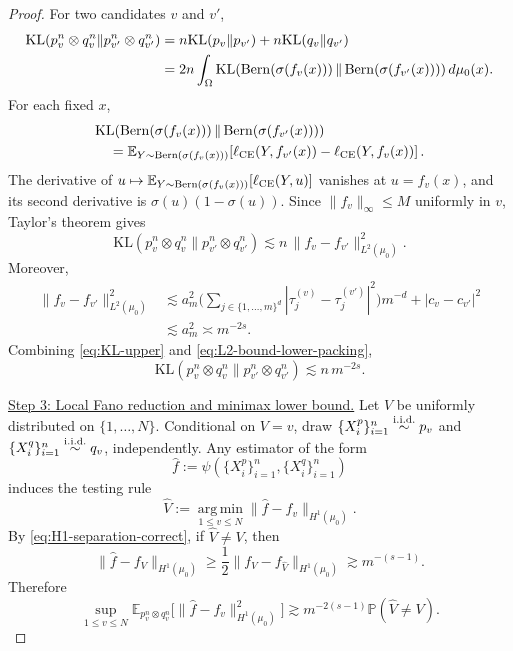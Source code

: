 \documentclass[11pt]{article}
\newcommand{\E}{\mathbb{E}}
\newcommand{\KL}{\mathrm{KL}}
\newcommand{\PP}{\mathbb{P}}
\newcommand{\argmin}{\operatorname*{arg\,min}}
\theoremstyle{plain}
\theoremstyle{definition}
\theoremstyle{remark}
\newcommand{\proofstep}[1]{\par\medskip\noindent\uline{#1}}
\begin{document}
\begin{proof}
For two candidates \(v\) and \(v'\),
\[
\begin{aligned}
  \KL(p_v^n\otimes q_v^n\|p_{v'}^n\otimes q_{v'}^n)
  &=
  n\KL(p_v\|p_{v'})
  +
  n\KL(q_v\|q_{v'})\\
  &=
  2n\int_\Omega
  \KL\!\left(
    {\rm Bern}(\sigma(f_v(x)))
    \,\middle\|\,
    {\rm Bern}(\sigma(f_{v'}(x)))
  \right)d\mu_0(x).
\end{aligned}
\]
For each fixed \(x\),
\[
\begin{aligned}
&\KL\!\left(
    {\rm Bern}(\sigma(f_v(x)))
    \,\middle\|\,
    {\rm Bern}(\sigma(f_{v'}(x)))
  \right)\\
&\quad =
\E_{Y\sim{\rm Bern}(\sigma(f_v(x)))}
\!\left[
  \ell_{\rm CE}(Y,f_{v'}(x))-\ell_{\rm CE}(Y,f_v(x))
\right].
\end{aligned}
\]
The derivative of
\(u\mapsto
\E_{Y\sim{\rm Bern}(\sigma(f_v(x)))}[\ell_{\rm CE}(Y,u)]\)
vanishes at \(u=f_v(x)\), and its second derivative is
\(\sigma(u)(1-\sigma(u))\). Since \(\|f_v\|_\infty\le M\) uniformly in \(v\),
Taylor's theorem gives
\begin{equation}\label{eq:KL-upper}
  \KL(p_v^n\otimes q_v^n\|p_{v'}^n\otimes q_{v'}^n)
  \lesssim
  n\,\|f_v-f_{v'}\|_{L^2(\mu_0)}^2.
\end{equation}
Moreover,
\begin{equation}\label{eq:L2-bound-lower-packing}
\begin{aligned}
  \|f_v-f_{v'}\|_{L^2(\mu_0)}^2
  &\lesssim
  a_m^2
  \Big(
    \sum_{j\in\{1,\dots,m\}^d}
    |\tau_j^{(v)}-\tau_j^{(v')}|^2
  \Big)m^{-d}
  +
  |c_v-c_{v'}|^2\\
  &\lesssim a_m^2
  \asymp m^{-2s}.
\end{aligned}
\end{equation}
Combining \eqref{eq:KL-upper} and \eqref{eq:L2-bound-lower-packing},
\begin{equation}\label{eq:kl-final-bound}
  \KL(p_v^n\otimes q_v^n\|p_{v'}^n\otimes q_{v'}^n)
  \lesssim n\,m^{-2s}.
\end{equation}

\proofstep{Step 3: Local Fano reduction and minimax lower bound.}
Let \(V\) be uniformly distributed on \(\{1,\dots,N\}\). Conditional on
\(V=v\), draw
\(\{X_i^p\}_{i=1}^n\stackrel{\rm i.i.d.}{\sim}p_v\) and
\(\{X_i^q\}_{i=1}^n\stackrel{\rm i.i.d.}{\sim}q_v\), independently. Any
estimator of the form
\[
\widehat f
:=
\psi\!\left(
\{X_i^p\}_{i=1}^n,
\{X_i^q\}_{i=1}^n
\right)
\]
induces the testing rule
\[
  \widehat V:=
  \argmin_{1\le v\le N}
  \big\|
    \widehat f-f_v
  \big\|_{H^1(\mu_0)}.
\]
By \eqref{eq:H1-separation-correct}, if \(\widehat V\neq V\), then
\[
  \|\widehat f-f_V\|_{H^1(\mu_0)}
  \ge
  \frac12\|f_V-f_{\widehat V}\|_{H^1(\mu_0)}
  \gtrsim
  m^{-(s-1)}.
\]
Therefore
\begin{equation}\label{eq:risk-vs-error}
  \sup_{1\le v\le N}
  \E_{p_v^n\otimes q_v^n}
  \big[\|\widehat f-f_v\|_{H^1(\mu_0)}^2\big]
  \gtrsim
  m^{-2(s-1)}\PP(\widehat V\neq V).
\end{equation}


\end{proof}
\end{document}

